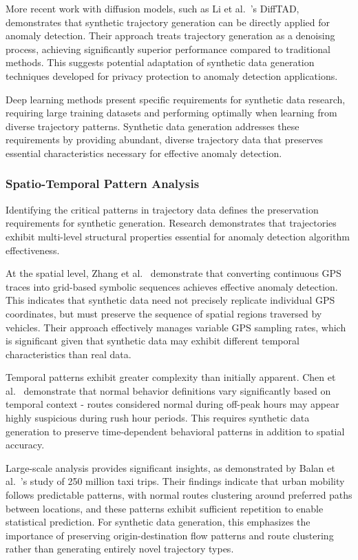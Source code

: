 More recent work with diffusion models, such as Li et al.~\cite{liDiffusionModelsVehicle2023}'s DiffTAD, demonstrates that synthetic trajectory generation can be directly applied for anomaly detection. Their approach treats trajectory generation as a denoising process, achieving significantly superior performance compared to traditional methods. This suggests potential adaptation of synthetic data generation techniques developed for privacy protection to anomaly detection applications.

Deep learning methods present specific requirements for synthetic data research, requiring large training datasets and performing optimally when learning from diverse trajectory patterns. Synthetic data generation addresses these requirements by providing abundant, diverse trajectory data that preserves essential characteristics necessary for effective anomaly detection.

\subsubsection{Spatio-Temporal Pattern Analysis}
\label{sec:spatio-temporal}

Identifying the critical patterns in trajectory data defines the preservation requirements for synthetic generation. Research demonstrates that trajectories exhibit multi-level structural properties essential for anomaly detection algorithm effectiveness.

At the spatial level, Zhang et al.~\cite{zhangIBATDetectingAnomalous2011} demonstrate that converting continuous GPS traces into grid-based symbolic sequences achieves effective anomaly detection. This indicates that synthetic data need not precisely replicate individual GPS coordinates, but must preserve the sequence of spatial regions traversed by vehicles. Their approach effectively manages variable GPS sampling rates, which is significant given that synthetic data may exhibit different temporal characteristics than real data.

Temporal patterns exhibit greater complexity than initially apparent. Chen et al.~\cite{chenTemporalContextAwareRoute2021} demonstrate that normal behavior definitions vary significantly based on temporal context - routes considered normal during off-peak hours may appear highly suspicious during rush hour periods. This requires synthetic data generation to preserve time-dependent behavioral patterns in addition to spatial accuracy.

Large-scale analysis provides significant insights, as demonstrated by Balan et al.~\cite{balanRealTimeTripInformation2011}'s study of 250 million taxi trips. Their findings indicate that urban mobility follows predictable patterns, with normal routes clustering around preferred paths between locations, and these patterns exhibit sufficient repetition to enable statistical prediction. For synthetic data generation, this emphasizes the importance of preserving origin-destination flow patterns and route clustering rather than generating entirely novel trajectory types.

